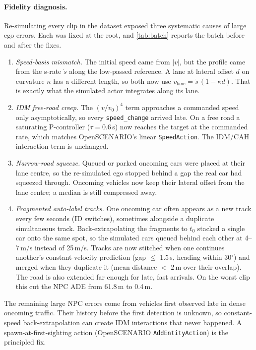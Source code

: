 \documentclass[10pt,a4paper]{article}
\begin{document}
\paragraph{Fidelity diagnosis.} Re-simulating every clip in the dataset exposed three systematic causes of large
ego errors. Each was fixed at the root, and \cref{tab:batch} reports the batch before and after the fixes.
\begin{enumerate}[leftmargin=1.4em,itemsep=0pt]
\item \emph{Speed-basis mismatch.} The initial speed came from $|v|$, but the profile came from the s-rate
  $\dot s$ along the low-passed reference. A lane at lateral offset $d$ on curvature $\kappa$ has a different
  length, so both now use $v_\text{lane} = \dot s\,(1-\kappa d)$. That is exactly what the simulated actor
  integrates along its lane.
\item \emph{IDM free-road creep.} The $(v/v_0)^4$ term approaches a commanded speed only asymptotically, so
  every \texttt{speed\_change} arrived late. On a free road a saturating P-controller ($\tau = 0.6$\,s) now
  reaches the target at the commanded rate, which matches OpenSCENARIO's linear \texttt{SpeedAction}. The
  IDM/CAH interaction term is unchanged.
\item \emph{Narrow-road squeeze.} Queued or parked oncoming cars were placed at their lane centre, so the
  re-simulated ego stopped behind a gap the real car had squeezed through. Oncoming vehicles now keep their
  lateral offset from the lane centre; a median is still compressed away.
\item \emph{Fragmented auto-label tracks.} One oncoming car often appears as a new track every few seconds
  (ID switches), sometimes alongside a duplicate simultaneous track. Back-extrapolating the fragments to $t_0$
  stacked a single car onto the same spot, so the simulated cars queued behind each other at 4--7\,m/s
  instead of 25\,m/s. Tracks are now stitched when one continues another's constant-velocity prediction
  (gap $\le$ 1.5\,s, heading within 30$^\circ$) and merged when they duplicate it (mean distance $<$ 2\,m over
  their overlap). The road is also extended far enough for late, fast arrivals. On the worst clip this cut
  the NPC ADE from 61.8\,m to 0.4\,m.
\end{enumerate}
The remaining large NPC errors come from vehicles first observed late in dense oncoming traffic. Their
history before the first detection is unknown, so constant-speed back-extrapolation can create IDM
interactions that never happened. A spawn-at-first-sighting action (OpenSCENARIO \texttt{AddEntityAction})
is the principled fix.
\end{document}
